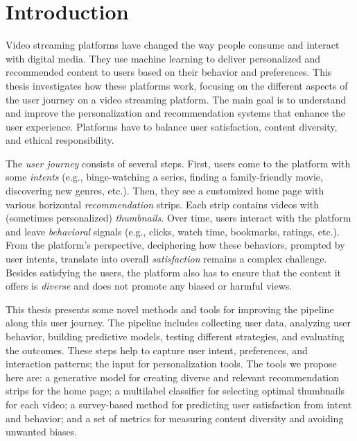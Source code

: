 
\chapter{Introduction}
\label{chapter:introduction}


Video streaming platforms have changed the way people consume and interact with digital media. They use machine learning to deliver personalized and recommended content to users based on their behavior and preferences. This thesis investigates how these platforms work, focusing on the different aspects of the user journey on a video streaming platform. The main goal is to understand and improve the personalization and recommendation systems that enhance the user experience. Platforms have to balance user satisfaction, content diversity, and ethical responsibility.

The \emph{user journey} consists of several steps. First, users come to the platform with some \emph{intents} (e.g., binge-watching a series, finding a family-friendly movie, discovering new genres, etc.). Then, they see a customized home page with various horizontal \emph{recommendation} strips. Each strip contains videos with (sometimes personalized) \emph{thumbnails}. Over time, users interact with the platform and leave \emph{behavioral} signals (e.g., clicks, watch time, bookmarks, ratings, etc.). From the platform's perspective, deciphering how these behaviors, prompted by user intents, translate into overall \emph{satisfaction} remains a complex challenge. Besides satisfying the users, the platform also has to ensure that the content it offers is \emph{diverse} and does not promote any biased or harmful views.

This thesis presents some novel methods and tools for improving the pipeline along this user journey. The pipeline includes collecting user data, analyzing user behavior, building predictive models, testing different strategies, and evaluating the outcomes. These steps help to capture user intent, preferences, and interaction patterns; the input for personalization tools. The tools we propose here are: a generative model for creating diverse and relevant recommendation strips for the home page; a multilabel classifier for selecting optimal thumbnails for each video; a survey-based method for predicting user satisfaction from intent and behavior; and a set of metrics for measuring content diversity and avoiding unwanted biases.

